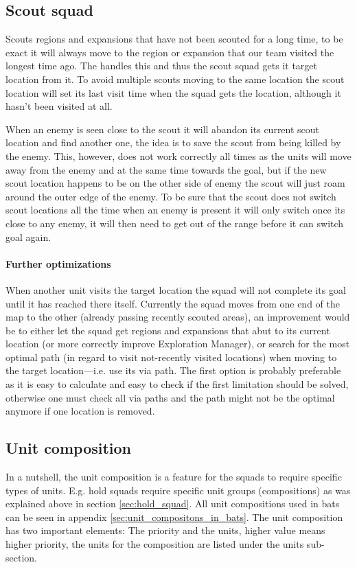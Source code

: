 \subsection{Scout squad}
\label{sec:scout_squad}
Scouts regions and expansions that have not been scouted for a long time, to be exact it will always move to the region or expansion that our team visited the longest time ago. The  handles this and thus the scout squad gets it target location from it. To avoid multiple scouts moving to the same location the scout location will set its last visit time when the squad gets the location, although it hasn't been visited at all.

When an enemy is seen close to the scout it will abandon its current scout location and find another one, the idea is to save the scout from being killed by the enemy. This, however, does not work correctly all times as the units will move away from the enemy and at the same time towards the goal, but if the new scout location happens to be on the other side of enemy the scout will just roam around the outer edge of the enemy. To be sure that the scout does not switch scout locations all the time when an enemy is present it will only switch once its close to any enemy, it will then need to get out of the range before it can switch goal again.

\paragraph{Further optimizations}
When another unit visits the target location the squad will not complete its goal until it has reached there itself. Currently the squad moves from one end of the map to the other (already passing recently scouted areas), an improvement would be to either let the squad get regions and expansions that abut to its current location (or more correctly improve Exploration Manager), or search for the most optimal path (in regard to visit not-recently visited locations) when moving to the target location—i.e. use its via path. The first option is probably preferable as it is easy to calculate and easy to check if the first limitation should be solved, otherwise one must check all via paths and the path might not be the optimal anymore if one location is removed.

\subsection{Unit composition}
\label{sec:unit_composition}
In a nutshell, the unit composition is a feature for the squads to require specific types of units. E.g. hold squads require specific unit groups (compositions) as was explained above in section \ref{sec:hold_squad}. All unit compositions used in bats can be seen in appendix \ref{sec:unit_compositons_in_bats}. The unit composition has two important elements: The priority and the units, higher value means higher priority, the units for the composition are listed under the units sub-section.

